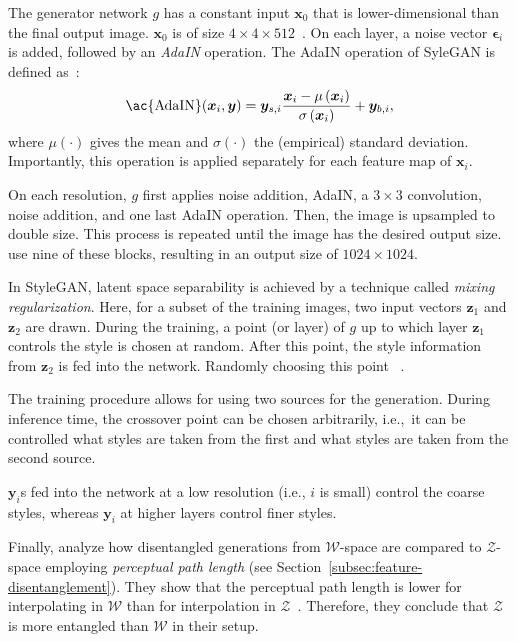 The generator network $g$ has a constant input $\bm{x}_0$ that is lower-dimensional than the final output image.
$\bm{x}_0$ is of size $4\times 4\times 512$~\citep{karras2019style}.
On each layer, a noise vector $\bm{\epsilon}_i$ is added, followed by an \textit{\acf{AdaIN}} operation.
The \ac{AdaIN} operation of SyleGAN is defined as~\citep{karras2019style}:
\begin{align}
    \text{\ac{AdaIN}}(\bm{x}_i, \bm{y}) = \bm{y}_{s, i} \frac{\bm{x}_{i}-\mu\left(\bm{x}_{i}\right)}{\sigma\left(\bm{x}_{i}\right)}+\bm{y}_{b, i},
\end{align}
where $\mu(\cdot)$ gives the mean and $\sigma(\cdot)$ the (empirical) standard deviation.
Importantly, this operation is applied separately for each feature map of $\bm{x}_i$.

On each resolution, $g$ first applies noise addition, \ac{AdaIN}, a $3\times 3$ convolution, noise addition, and one last \ac{AdaIN} operation.
Then, the image is upsampled to double size.
This process is repeated until the image has the desired output size.
\citet{karras2019style} use nine of these blocks, resulting in an output size of $1024\times 1024$.

In StyleGAN, latent space separability is achieved by a technique called \textit{mixing regularization}.
Here, for a subset of the training images, two input vectors $\bm{z}_1$ and $\bm{z}_2$ are drawn.
During the training, a point (or layer) of $g$ up to which layer $\bm{z}_1$ controls the style is chosen at random.
After this point, the style information from $\bm{z}_2$ is fed into the network.
Randomly choosing this point ~\citep{karras2019style}.

The training procedure allows for using two sources for the generation.
During inference time, the crossover point can be chosen arbitrarily, i.e.,~it can be controlled what styles are taken from the first and what styles are taken from the second source.

$\bm{y}_i$s fed into the network at a low resolution (i.e., $i$ is small) control the coarse styles, whereas $\bm{y}_i$ at higher layers control finer styles.

Finally, \citet{karras2019style} analyze how disentangled generations from $\mathcal{W}$-space are compared to $\mathcal{Z}$-space employing \textit{perceptual path length} (see Section~\ref{subsec:feature-disentanglement}).
They show that the perceptual path length is lower for interpolating in $\mathcal{W}$ than for interpolation in $\mathcal{Z}$~\citep{karras2019style}.
Therefore, they conclude that $\mathcal{Z}$ is more entangled than $\mathcal{W}$ in their setup.

